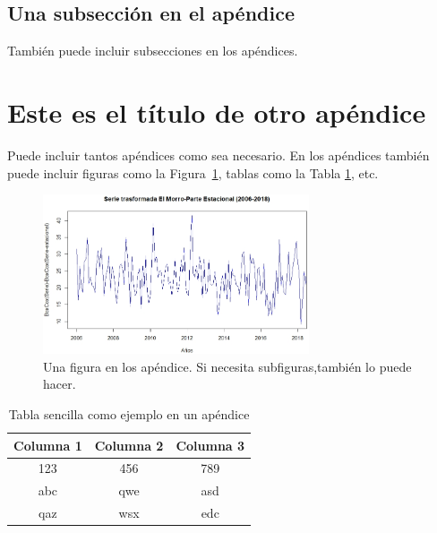 \documentclass[artMGITG,SIG,accept,moreauthors,font4]{mgitg}
\begin{document}
\subsection{Una subsección en el apéndice}
También puede incluir subsecciones en los apéndices.

\section{Este es el título de otro apéndice}
Puede incluir tantos apéndices como sea necesario. En los apéndices también puede incluir figuras como la Figura~\ref{figAp1}, tablas como la Tabla \ref{tabAp1}, etc.

\begin{figure}[!ht]
    \centering
    \includegraphics[width=0.7\textwidth]{figuras/figura4b}
    \caption{Una figura en los apéndice. Si necesita subfiguras,también lo puede hacer.}
    \label{figAp1}
\end{figure}



\begin{table}[!ht]    
    \centering
    \caption{Tabla sencilla como ejemplo en un apéndice}
        \begin{tabular}{ccc}
        \toprule
        Columna 1 & Columna 2 & Columna 3\\
        \midrule
        123  & 456 & 789\\
        abc & qwe & asd\\
        qaz & wsx & edc\\
        \bottomrule
        \end{tabular}
    \label{tabAp1}
\end{table}
\end{document}
